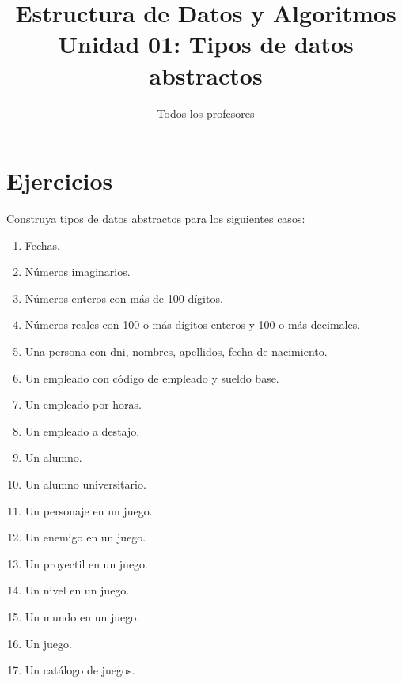 \documentclass{article}
\title{Estructura de Datos y Algoritmos \\
  \large Unidad 01: Tipos de datos abstractos}
\author{Todos los profesores}
\date{}
\begin{document}
\maketitle

\section{Ejercicios}

Construya tipos de datos abstractos para los siguientes casos:
\begin{enumerate}
\item Fechas.
\item Números imaginarios.
\item Números enteros con más de 100 dígitos.
\item Números reales con 100 o más dígitos enteros y 100 o más decimales.
\item Una persona con dni, nombres, apellidos, fecha de nacimiento.
\item Un empleado con código de empleado y sueldo base.
\item Un empleado por horas.
\item Un empleado a destajo.
\item Un alumno.
\item Un alumno universitario.
\item Un personaje en un juego.
\item Un enemigo en un juego.
\item Un proyectil en un juego.
\item Un nivel en un juego.
\item Un mundo en un juego.
\item Un juego.
\item Un catálogo de juegos.
\end{enumerate}
\end{document}
